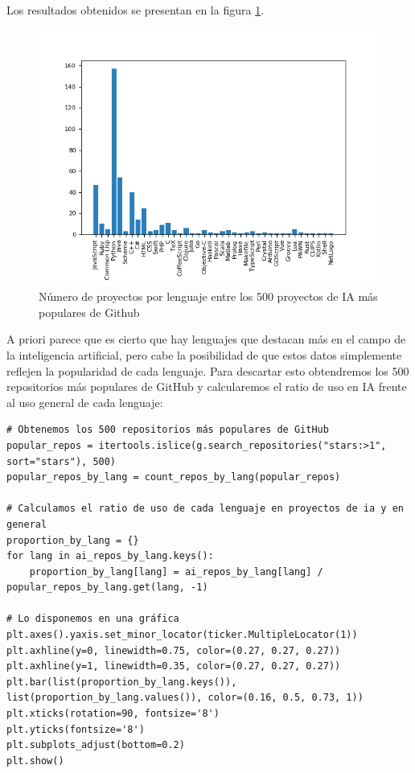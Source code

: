 Los resultados obtenidos se presentan en la figura \ref{fig:ailang}.\\

\begin{figure}[h]
  \begin{center}
    \includegraphics[width=1.0\textwidth]{imagenes/ai-lang.png}
    \caption{Número de proyectos por lenguaje entre los 500 proyectos de IA más populares de Github}
    \label{fig:ailang}
  \end{center}
\end{figure}

A priori parece que es cierto que hay lenguajes que destacan más en el campo de la inteligencia artificial, pero cabe la posibilidad de que estos datos simplemente reflejen la popularidad de cada lenguaje. Para descartar esto obtendremos los 500 repositorios más populares de GitHub y calcularemos el ratio de uso en IA frente al uso general de cada lenguaje:\\

\begin{lstlisting}[style=python, caption={Script para obtener el ratio entre proyectos de IA y proyectos generales por lenguaje en Github}]
# Obtenemos los 500 repositorios más populares de GitHub
popular_repos = itertools.islice(g.search_repositories("stars:>1", sort="stars"), 500)
popular_repos_by_lang = count_repos_by_lang(popular_repos)

# Calculamos el ratio de uso de cada lenguaje en proyectos de ia y en general
proportion_by_lang = {}
for lang in ai_repos_by_lang.keys():
	proportion_by_lang[lang] = ai_repos_by_lang[lang] / popular_repos_by_lang.get(lang, -1)

# Lo disponemos en una gráfica
plt.axes().yaxis.set_minor_locator(ticker.MultipleLocator(1))
plt.axhline(y=0, linewidth=0.75, color=(0.27, 0.27, 0.27))
plt.axhline(y=1, linewidth=0.35, color=(0.27, 0.27, 0.27))
plt.bar(list(proportion_by_lang.keys()), list(proportion_by_lang.values()), color=(0.16, 0.5, 0.73, 1))
plt.xticks(rotation=90, fontsize='8')
plt.yticks(fontsize='8')
plt.subplots_adjust(bottom=0.2)
plt.show()
\end{lstlisting}

